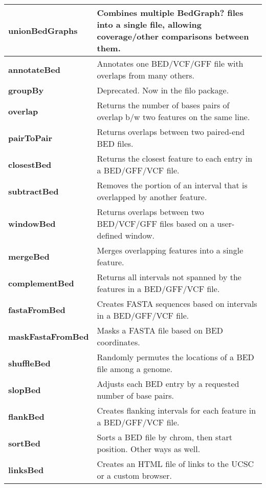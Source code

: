 \documentclass[letterpaper,10pt,english]{sphinxmanual}
\begin{document}
\begin{tabulary}{\linewidth}{|L|L|}
\textbf{unionBedGraphs}
 & 
Combines multiple BedGraph? files into a single file, allowing coverage/other comparisons between them.
\\\hline

\textbf{annotateBed}
 & 
Annotates one BED/VCF/GFF file with overlaps from many others.
\\\hline

\textbf{groupBy}
 & 
Deprecated. Now in the filo package.
\\\hline

\textbf{overlap}
 & 
Returns the number of bases pairs of overlap b/w two features on the same line.
\\\hline

\textbf{pairToPair}
 & 
Returns overlaps between two paired-end BED files.
\\\hline

\textbf{closestBed}
 & 
Returns the closest feature to each entry in a BED/GFF/VCF file.
\\\hline

\textbf{subtractBed}
 & 
Removes the portion of an interval that is overlapped by another feature.
\\\hline

\textbf{windowBed}
 & 
Returns overlaps between two BED/VCF/GFF files based on a user-defined window.
\\\hline

\textbf{mergeBed}
 & 
Merges overlapping features into a single feature.
\\\hline

\textbf{complementBed}
 & 
Returns all intervals not spanned by the features in a BED/GFF/VCF file.
\\\hline

\textbf{fastaFromBed}
 & 
Creates FASTA sequences based on intervals in a BED/GFF/VCF file.
\\\hline

\textbf{maskFastaFromBed}
 & 
Masks a FASTA file based on BED coordinates.
\\\hline

\textbf{shuffleBed}
 & 
Randomly permutes the locations of a BED file among a genome.
\\\hline

\textbf{slopBed}
 & 
Adjusts each BED entry by a requested number of base pairs.
\\\hline

\textbf{flankBed}
 & 
Creates flanking intervals for each feature in a BED/GFF/VCF file.
\\\hline

\textbf{sortBed}
 & 
Sorts a BED file by chrom, then start position. Other ways as well.
\\\hline

\textbf{linksBed}
 & 
Creates an HTML file of links to the UCSC or a custom browser.
\\\hline
\end{tabulary}
\end{document}
